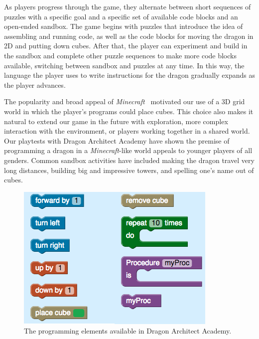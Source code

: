 \documentclass{sig-alternate}
\newcommand{\gametitle}{{\color{RoyalPurple} Dragon Architect Academy}}
\begin{document}
As players progress through the game, they alternate between short sequences of puzzles with a specific goal and a specific set of available code blocks and an open-ended sandbox. 
The game begins with puzzles that introduce the idea of assembling and running code, as well as the code blocks for moving the dragon in 2D and putting down cubes.
After that, the player can experiment and build in the sandbox and complete other puzzle sequences to make more code blocks available, switching between sandbox and puzzles at any time. 
In this way, the language the player uses to write instructions for the dragon gradually expands as the player advances.

The popularity and broad appeal of \emph{Minecraft}~\cite{minecraft} motivated our use of a 3D grid world in which the player's programs could place cubes.
This choice also makes it natural to extend our game in the future with exploration, more complex interaction with the environment, or players working together in a shared world.
Our playtests with \gametitle{} have shown the premise of programming a dragon in a \emph{Minecraft}-like world appeals to younger players of all genders.
Common sandbox activities have included making the dragon travel very long distances, building big and impressive towers, and spelling one's name out of cubes.

\begin{figure}[htb]
  \centering
  \includegraphics[width=\columnwidth]{images/toolbox-wide}
  \caption{The programming elements available in \gametitle{}.}
  \label{fig:toolbox}
\end{figure}
\end{document}
